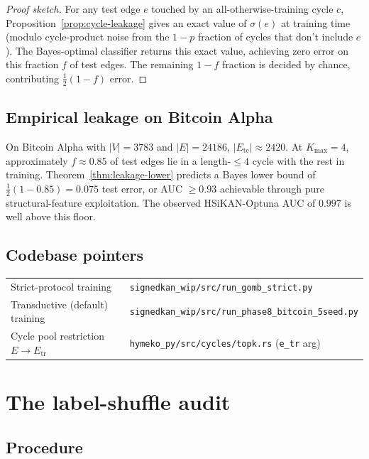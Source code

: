 \documentclass[11pt,a4paper]{article}
\theoremstyle{remark}
\begin{document}
\begin{proof}[Proof sketch]
For any test edge $e$ touched by an all-otherwise-training cycle
$c$, Proposition~\ref{prop:cycle-leakage} gives an exact value
of $\sigma(e)$ at training time (modulo cycle-product noise from
the $1 - p$ fraction of cycles that don't include $e$). The
Bayes-optimal classifier returns this exact value, achieving
zero error on this fraction $f$ of test edges. The remaining
$1 - f$ fraction is decided by chance, contributing $\frac{1}{2}(1 - f)$
error.
\end{proof}

\subsection{Empirical leakage on Bitcoin Alpha}

On Bitcoin Alpha with $|V| = 3783$ and $|E| = 24186$,
$|E_{\text{te}}| \approx 2420$. At $K_{\max} = 4$, approximately
$f \approx 0.85$ of test edges lie in a length-$\leq 4$ cycle
with the rest in training. Theorem~\ref{thm:leakage-lower}
predicts a Bayes lower bound of
$\frac{1}{2}(1 - 0.85) = 0.075$ test error,
or AUC $\geq 0.93$ achievable through pure structural-feature
exploitation. The observed HSiKAN-Optuna AUC of $0.997$ is well
above this floor.

\subsection{Codebase pointers}

\begin{tabular}{ll}
Strict-protocol training & \texttt{signedkan\_wip/src/run\_gomb\_strict.py} \\
Transductive (default) training & \texttt{signedkan\_wip/src/run\_phase8\_bitcoin\_5seed.py} \\
Cycle pool restriction $E \to E_{\text{tr}}$ & \texttt{hymeko\_py/src/cycles/topk.rs} (\texttt{e\_tr} arg) \\
\end{tabular}

\section{The label-shuffle audit}

\subsection{Procedure}
\end{document}
